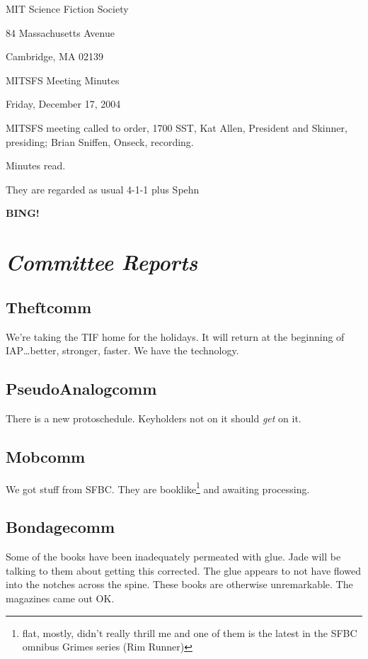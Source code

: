 \documentclass[10pt]{article}
\newcommand{\bing}{{\bf BING!} }
\newcommand{\goto}[1]{\bing \vskip 12pt \section*{{\em{#1}}}}
\newcommand{\ps}{ plus Spehn\xspace}
\begin{document}
\begin{center}

MIT Science Fiction Society

84 Massachusetts Avenue

Cambridge, MA 02139

\vspace{12pt}

MITSFS Meeting Minutes

Friday, December 17, 2004

\end{center}

\vspace{18pt}

\setlength{\parskip}{6pt}

\noindent
MITSFS meeting called to order, 1700 SST, Kat Allen, President and
Skinner, presiding; Brian Sniffen,  Onseck, recording.

Minutes read.

They are regarded as usual 4-1-1\ps

\goto{Committee Reports}
\subsection*{Theftcomm}
We're taking the TIF home for the holidays.  It will return at the
beginning of IAP\dots better, stronger, faster.  We have the
technology.

\subsection*{PseudoAnalogcomm}
There is a new protoschedule.  Keyholders not on it should \emph{get}
on it.

\subsection*{Mobcomm}
We got stuff from SFBC.  They are booklike\footnote{flat, mostly,
  didn't really thrill me and one of them is the latest in the SFBC
  omnibus Grimes series (Rim Runner)} and awaiting processing.

\subsection*{Bondagecomm}
Some of the books have been inadequately permeated with glue.  Jade
will be talking to them about getting this corrected.  The glue
appears to not have flowed into the notches across the spine.  These
books are otherwise unremarkable.  The magazines came out OK.
\end{document}
